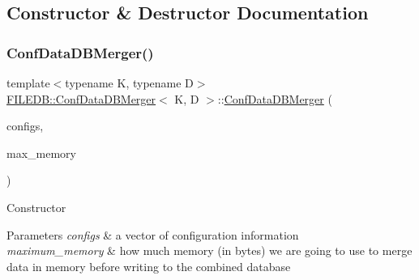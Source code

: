 \subsection{Constructor \& Destructor Documentation}
\mbox{\label{classFILEDB_1_1ConfDataDBMerger_a2d22aeb10cb29cd9acb42cbd042c74d3}} 
\subsubsection{\texorpdfstring{ConfDataDBMerger()}{ConfDataDBMerger()}\hspace{0.1cm}{\footnotesize\ttfamily [1/4]}}
{\footnotesize\ttfamily template$<$typename K, typename D$>$ \\
\mbox{\hyperlink{classFILEDB_1_1ConfDataDBMerger}{F\+I\+L\+E\+D\+B\+::\+Conf\+Data\+D\+B\+Merger}}$<$ K, D $>$\+::\mbox{\hyperlink{classFILEDB_1_1ConfDataDBMerger}{Conf\+Data\+D\+B\+Merger}} (\begin{DoxyParamCaption}\item[{const std\+::vector$<$ \mbox{\hyperlink{classFILEDB_1_1ConfigInfo}{Config\+Info}} $>$ \&}]{configs,  }\item[{unsigned int}]{max\+\_\+memory }\end{DoxyParamCaption})\hspace{0.3cm}{\ttfamily [inline]}}

Constructor 
\begin{DoxyParams}{Parameters}
{\em configs} & a vector of configuration information \\
\hline
{\em maximum\+\_\+memory} & how much memory (in bytes) we are going to use to merge data in memory before writing to the combined database \\
\hline
\end{DoxyParams}
\mbox{\label{classFILEDB_1_1ConfDataDBMerger_a495cdfd447f2ed64776d87601c36a05b}} 
